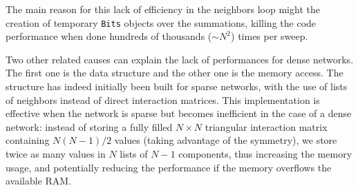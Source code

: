 The main reason for this lack of efficiency in the neighbors loop might the creation of temporary \texttt{Bits} objects over the summations, killing the code performance when done hundreds of thousands ($\sim N^2$) times per sweep.

Two other related causes can explain the lack of performances for dense networks. The first one is the data structure and the other one is the memory access. The structure has indeed initially been built for sparse networks, with the use of lists of neighbors instead of direct interaction matrices. This implementation is effective when the network is sparse but becomes inefficient in the case of a dense network: instead of storing a fully filled $N \times N$ triangular interaction matrix containing $N \left(N-1\right)/2$ values (taking advantage of the symmetry), we store twice as many values in $N$ lists of $N-1$ components, thus increasing the memory usage, and potentially reducing the performance if the memory overflows the available RAM.

